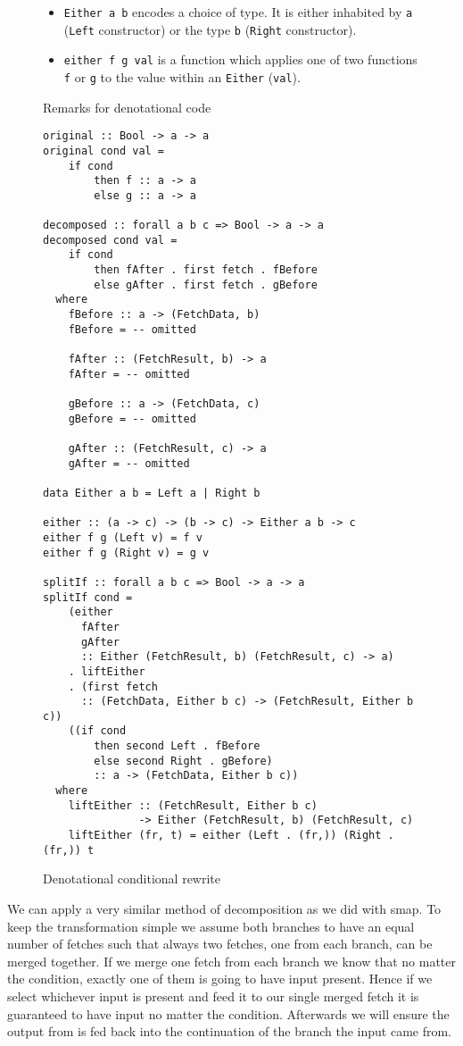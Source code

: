 \begin{figure}
\begin{itemize}
  \item \texttt{Either a b} encodes a choice of type. It is either inhabited by \texttt{a} (\texttt{Left} constructor) or the type \texttt{b} (\texttt{Right} constructor).
  \item \texttt{either f g val} is a function which applies one of two functions \texttt{f} or \texttt{g} to the value within an \texttt{Either} (\texttt{val}).
\end{itemize}
\caption{Remarks for denotational code}
\end{figure}


\begin{figure}
\begin{verbatim}
original :: Bool -> a -> a
original cond val =
    if cond
        then f :: a -> a
        else g :: a -> a

decomposed :: forall a b c => Bool -> a -> a
decomposed cond val =
    if cond
        then fAfter . first fetch . fBefore
        else gAfter . first fetch . gBefore
  where
    fBefore :: a -> (FetchData, b)
    fBefore = -- omitted

    fAfter :: (FetchResult, b) -> a
    fAfter = -- omitted

    gBefore :: a -> (FetchData, c)
    gBefore = -- omitted

    gAfter :: (FetchResult, c) -> a
    gAfter = -- omitted

data Either a b = Left a | Right b

either :: (a -> c) -> (b -> c) -> Either a b -> c
either f g (Left v) = f v
either f g (Right v) = g v

splitIf :: forall a b c => Bool -> a -> a
splitIf cond =
    (either
      fAfter
      gAfter
      :: Either (FetchResult, b) (FetchResult, c) -> a)
    . liftEither
    . (first fetch
      :: (FetchData, Either b c) -> (FetchResult, Either b c))
    ((if cond
        then second Left . fBefore
        else second Right . gBefore)
        :: a -> (FetchData, Either b c))
  where
    liftEither :: (FetchResult, Either b c)
               -> Either (FetchResult, b) (FetchResult, c)
    liftEither (fr, t) = either (Left . (fr,)) (Right . (fr,)) t
\end{verbatim}
\caption{Denotational conditional rewrite}
\label{fig:if-rewrite-in-code}
\end{figure}

We can apply a very similar method of decomposition as we did with smap.
To keep the transformation simple we assume both branches to have an equal number of fetches such that always two fetches, one from each branch, can be merged together.
If we merge one fetch from each branch we know that no matter the condition, exactly one of them is going to have input present.
Hence if we select whichever input is present and feed it to our single merged fetch it is guaranteed to have input no matter the condition.
Afterwards we will ensure the output from \fetch{} is fed back into the continuation of the branch the input came from.

